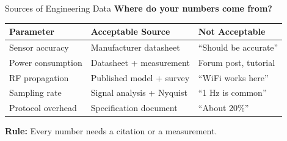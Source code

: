 \documentclass[aspectratio=169,11pt]{beamer}
\begin{document}
\begin{frame}{Sources of Engineering Data}
    \textbf{Where do your numbers come from?}
    
    \vspace{0.3cm}
    \begin{table}
        \centering
        \small
        \begin{tabular}{@{}p{3.5cm}p{4.5cm}p{4.5cm}@{}}
            \toprule
            \textbf{Parameter} & \textbf{Acceptable Source} & \textbf{Not Acceptable} \\
            \midrule
            Sensor accuracy & Manufacturer datasheet & ``Should be accurate'' \\
            \addlinespace
            Power consumption & Datasheet + measurement & Forum post, tutorial \\
            \addlinespace
            RF propagation & Published model + survey & ``WiFi works here'' \\
            \addlinespace
            Sampling rate & Signal analysis + Nyquist & ``1 Hz is common'' \\
            \addlinespace
            Protocol overhead & Specification document & ``About 20\%'' \\
            \bottomrule
        \end{tabular}
    \end{table}
    
    \vspace{0.3cm}
    \textbf{Rule:} Every number needs a citation or a measurement.
\end{frame}
\end{document}
